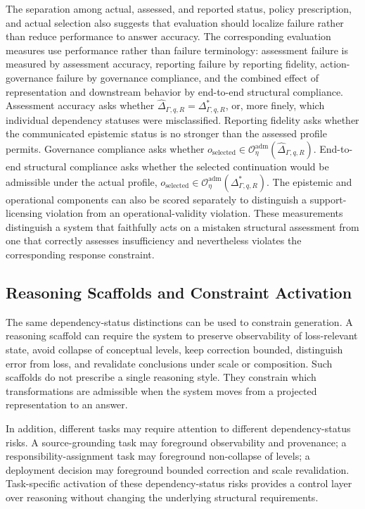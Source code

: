 \documentclass[11pt]{article}
\theoremstyle{definition}
\theoremstyle{remark}
\begin{document}
The separation among actual, assessed, and reported status, policy prescription, and actual selection also suggests that evaluation should localize failure rather than reduce performance to answer accuracy. The corresponding evaluation measures use performance rather than failure terminology: assessment failure is measured by assessment accuracy, reporting failure by reporting fidelity, action-governance failure by governance compliance, and the combined effect of representation and downstream behavior by end-to-end structural compliance. Assessment accuracy asks whether \(\widehat{\Delta}_{\Gamma,q,R}=\Delta^{*}_{\Gamma,q,R}\), or, more finely, which individual dependency statuses were misclassified. Reporting fidelity asks whether the communicated epistemic status is no stronger than the assessed profile permits. Governance compliance asks whether \(o_{\mathrm{selected}}\in \mathcal O^{\mathrm{adm}}_{\eta} (\widehat{\Delta}_{\Gamma,q,R})\). End-to-end structural compliance asks whether the selected continuation would be admissible under the actual profile, \(o_{\mathrm{selected}}\in \mathcal O^{\mathrm{adm}}_{\eta} (\Delta^{*}_{\Gamma,q,R})\). The epistemic and operational components can also be scored separately to distinguish a support-licensing violation from an operational-validity violation. These measurements distinguish a system that faithfully acts on a mistaken structural assessment from one that correctly assesses insufficiency and nevertheless violates the corresponding response constraint.

\subsection{Reasoning Scaffolds and Constraint Activation}

The same dependency-status distinctions can be used to constrain generation. A reasoning scaffold can require the system to preserve observability of loss-relevant state, avoid collapse of conceptual levels, keep correction bounded, distinguish error from loss, and revalidate conclusions under scale or composition. Such scaffolds do not prescribe a single reasoning style. They constrain which transformations are admissible when the system moves from a projected representation to an answer.

In addition, different tasks may require attention to different dependency-status risks. A source-grounding task may foreground observability and provenance; a responsibility-assignment task may foreground non-collapse of levels; a deployment decision may foreground bounded correction and scale revalidation. Task-specific activation of these dependency-status risks provides a control layer over reasoning without changing the underlying structural requirements.
\end{document}
